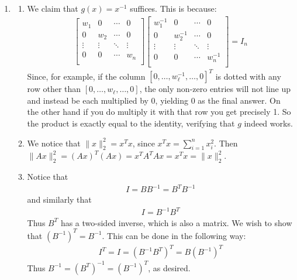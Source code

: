 \documentclass[12pt]{article}
\theoremstyle{definitionstyle}
\newcommand{\mg}[1]{\| #1 \|}
\begin{document}
\begin{enumerate}[leftmargin=\labelsep]
		\item \begin{enumerate}
			\item We claim that $g(x) = x^{-1}$ suffices. This is because:
			\begin{align*}
				\begin{bmatrix} 
					w_1 & 0 & \cdots & 0 \\
					0 & w_2 & \cdots & 0 \\
					\vdots & \vdots & \ddots & \vdots \\
					0 & 0 & \cdots & w_n \\
				\end{bmatrix} \begin{bmatrix} 
					w_1^{-1} & 0 & \cdots & 0 \\
					0 & w_2^{-1} & \cdots & 0 \\
					\vdots & \vdots & \ddots & \vdots \\
					0 & 0 & \cdots & w_n^{-1} \\
				\end{bmatrix} = I_n
			\end{align*}
			Since, for example, if the column $[0, \ldots, w_\ell^{-1}, \ldots, 0]^T$ is dotted with any row other than $[0, \ldots, w_\ell, \ldots, 0]$, the only non-zero entries will not line up and instead be each multiplied by 0, yielding 0 as the final answer. On the other hand if you do multiply it with that row you get precisely 1. So the product is exactly equal to the identity, verifying that $g$ indeed works.
			
			\item We notice that $\mg{x}_2^2 = x^Tx$, since $x^Tx = \sum_{i=1}^n x_i^2$. Then $\mg{Ax}_2^2 = (Ax)^T(Ax) = x^TA^TAx = x^Tx = \mg{x}_2^2$.
			
			\item Notice that
			\begin{align*}
				I = BB^{-1} = B^TB^{-1}
			\end{align*}
			and similarly that 
			\begin{align*}
				I = B^{-1}B^T
			\end{align*}
			Thus $B^T$ has a two-sided inverse, which is also a matrix. We wish to show that $(B^{-1})^T = B^{-1}$. This can be done in the following way:
			\begin{align*}
				I^T = I = (B^{-1}B^T)^T = B (B^{-1})^T
			\end{align*}
			Thus $B^{-1} = (B^T)^{-1} = (B^{-1})^T$, as desired.
			

\end{enumerate}
\end{enumerate}
\end{document}

